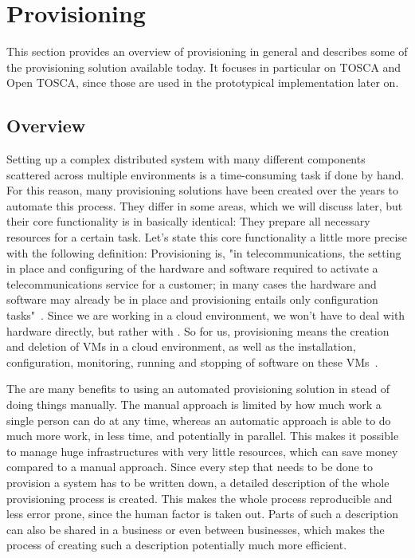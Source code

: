 \section{Provisioning}
\label{fundamentals:provisioning}

This section provides an overview of provisioning in general and describes some of the provisioning solution available today.
It focuses in particular on TOSCA and Open TOSCA, since those are used in the prototypical implementation later on.

\subsection{Overview}

Setting up a complex distributed system with many different components scattered across multiple environments is a time-consuming task if done by hand.
For this reason, many provisioning solutions have been created over the years to automate this process.
They differ in some areas, which we will discuss later, but their core functionality is in basically identical: They prepare all necessary resources for a certain task.
Let's state this core functionality a little more precise with the following definition: Provisioning is, "in telecommunications, the setting in place and configuring of the hardware and software required to activate a telecommunications service for a customer; in many cases the hardware and software may already be in place and provisioning entails only configuration tasks"~\autocite{def:provisioning}.
Since we are working in a cloud environment, we won't have to deal with hardware directly, but rather with .
So for us, provisioning means the creation and deletion of VMs in a cloud environment, as well as the installation, configuration, monitoring, running and stopping of software on these VMs~\autocite{towardsprovisioning}.

The are many benefits to using an automated provisioning solution in stead of doing things manually.
The manual approach is limited by how much work a single person can do at any time, whereas an automatic approach is able to do much more work, in less time, and potentially in parallel.
This makes it possible to manage huge infrastructures with very little resources, which can save money compared to a manual approach.
Since every step that needs to be done to provision a system has to be written down, a detailed description of the whole provisioning process is created.
This makes the whole process reproducible and less error prone, since the human factor is taken out.
Parts of such a description can also be shared in a business or even between businesses, which makes the process of creating such a description potentially much more efficient.

